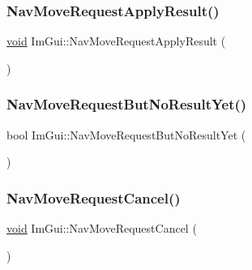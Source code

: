 \mbox{\label{namespaceImGui_a87c0b18dc173341304a700b096681c51}} 
\subsubsection{\texorpdfstring{Nav\+Move\+Request\+Apply\+Result()}{NavMoveRequestApplyResult()}}
{\footnotesize\ttfamily \hyperlink{imgui__impl__opengl3__loader_8h_ac668e7cffd9e2e9cfee428b9b2f34fa7}{void} Im\+Gui\+::\+Nav\+Move\+Request\+Apply\+Result (\begin{DoxyParamCaption}{ }\end{DoxyParamCaption})}

\mbox{\label{namespaceImGui_a3fab98556d11690efd4f7f2fde94968e}} 
\subsubsection{\texorpdfstring{Nav\+Move\+Request\+But\+No\+Result\+Yet()}{NavMoveRequestButNoResultYet()}}
{\footnotesize\ttfamily bool Im\+Gui\+::\+Nav\+Move\+Request\+But\+No\+Result\+Yet (\begin{DoxyParamCaption}{ }\end{DoxyParamCaption})}

\mbox{\label{namespaceImGui_a43326bb080d9fa80327ed81d864d8b8d}} 
\subsubsection{\texorpdfstring{Nav\+Move\+Request\+Cancel()}{NavMoveRequestCancel()}}
{\footnotesize\ttfamily \hyperlink{imgui__impl__opengl3__loader_8h_ac668e7cffd9e2e9cfee428b9b2f34fa7}{void} Im\+Gui\+::\+Nav\+Move\+Request\+Cancel (\begin{DoxyParamCaption}{ }\end{DoxyParamCaption})}


